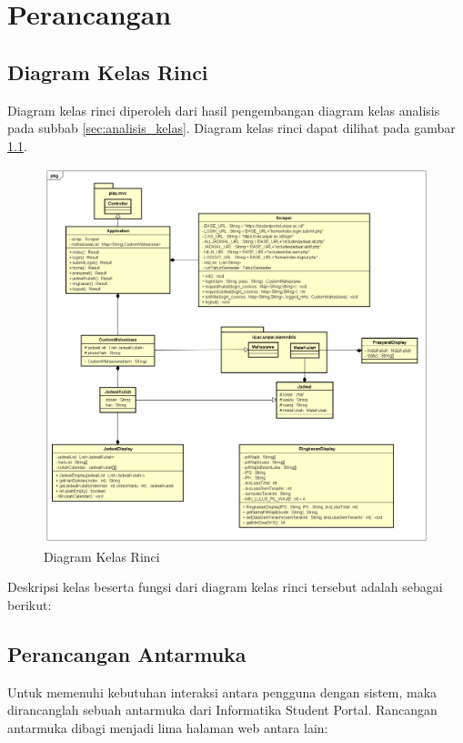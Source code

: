 \chapter{Perancangan}
\label{chap:perancangan}

\section{Diagram Kelas Rinci} 
\label{sec:diagram_kelas_rinci}
Diagram kelas rinci diperoleh dari hasil pengembangan diagram kelas analisis pada subbab \ref{sec:analisis_kelas}. Diagram kelas rinci dapat dilihat pada gambar \ref{fig:4_final_class_diagram}. 
	\begin{figure}[H]
			\centering
			\includegraphics[scale=0.5]{Gambar/class-diagram-final}
			\caption{Diagram Kelas Rinci} 
			\label{fig:4_final_class_diagram}
		\end{figure}
	Deskripsi kelas beserta fungsi dari diagram kelas rinci tersebut adalah sebagai berikut:
	

\section{Perancangan Antarmuka}
\label{sec:perancangan_antarmuka}

Untuk memenuhi kebutuhan interaksi antara pengguna dengan sistem, maka dirancanglah sebuah antarmuka dari Informatika Student Portal. Rancangan antarmuka dibagi menjadi lima halaman web antara lain:

